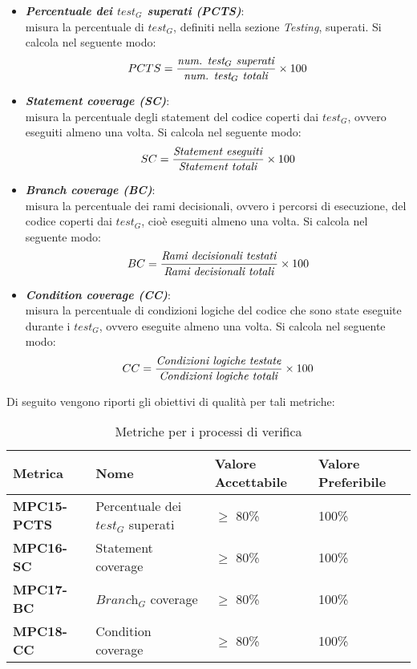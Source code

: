 \begin{itemize}
    \item \textbf{\emph{Percentuale dei $\textit{test}_G$ superati (PCTS)}}:\\
    misura la percentuale di $\textit{test}_G$, definiti nella sezione \emph{Testing}, superati. Si calcola nel seguente modo:
    \[
    PCTS = \frac{\text{\emph{num. $\textit{test}_G$ superati}}}{\text{\emph{{num. $\textit{test}_G$ totali}}}}\times100
    \]
    \item \textbf{\emph{Statement coverage (SC)}}: \\
    misura la percentuale degli statement del codice coperti dai $\textit{test}_G$, ovvero eseguiti almeno una volta. Si calcola nel seguente modo:
      \[
    SC = \frac{\text{\emph{Statement eseguiti}}}{\text{\emph{{Statement totali}}}}\times100
    \]
    \item \textbf{\emph{Branch coverage (BC)}}: \\
    misura la percentuale dei rami decisionali, ovvero i percorsi di esecuzione, del codice coperti dai $\textit{test}_G$, cioè eseguiti almeno una volta. Si calcola nel seguente modo:
     \[
    BC = \frac{\text{\emph{Rami decisionali testati}}}{\text{\emph{{Rami decisionali totali}}}}\times100
    \]
    \item \textbf{\emph{Condition coverage (CC)}}:\\
    misura la percentuale di condizioni logiche del codice che sono state eseguite durante i $\textit{test}_G$, ovvero eseguite almeno una volta. Si calcola nel seguente modo:
    \[
    CC = \frac{\text{\emph{Condizioni logiche testate}}}{\text{\emph{{Condizioni logiche totali}}}}\times100
    \]
\end{itemize}
Di seguito vengono riporti gli obiettivi di qualità per tali metriche:
\begin{table}[htbp]
    \centering
    \begin{tabular}{|>{\centering\arraybackslash}p{4cm}|p{4cm}|p{4cm}|p{4cm}|}
    \hline
    \rowcolor{gray!30}
    \textbf{Metrica} & \textbf{Nome} & \textbf{Valore Accettabile} & \textbf{Valore Preferibile} \\
    \hline
    \rowcolor{gray!10}
    \textbf{MPC15-PCTS} & Percentuale dei $\textit{test}_G$ superati & $\geq$ 80\% & 100\% \\
    \hline
    \rowcolor{gray!10}
    \textbf{MPC16-SC} & Statement coverage & $\geq$ 80\% & 100\% \\
    \hline
     \rowcolor{gray!10}
    \textbf{MPC17-BC} & $\textit{Branch}_G$ coverage & $\geq$ 80\% & 100\% \\
    \hline
     \rowcolor{gray!10}
    \textbf{MPC18-CC} & Condition coverage & $\geq$ 80\% & 100\% \\
    \hline
    \end{tabular}
    \caption{Metriche per i processi di verifica}
\end{table}
